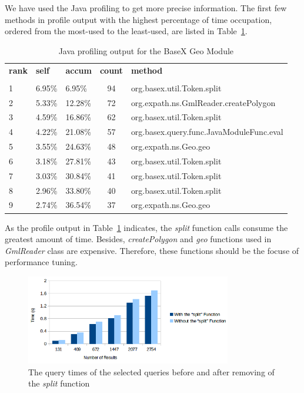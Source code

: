 \documentclass[a4paper,12pt]{article}
\begin{document}
We have used the Java profiling to get more precise information. The first few methods in profile output with the highest percentage of time occupation, ordered from the most-used to the least-used, are listed in Table~\ref{javaprofile}.
\begin{table}
\begin{tabular}{l l l c l}
\textbf{rank} & \textbf{self} & \textbf{accum} & \textbf{count} & \textbf{method} \\
 & & & &\\
1 & 6.95\% & 6.95\% & 94 & org.basex.util.Token.{\color{red}split}\\
2 & 5.33\% & 12.28\% & 72 & org.expath.ns.GmlReader.createPolygon \\
3 & 4.59\% & 16.86\% & 62 & org.basex.util.Token.{\color{red}split} \\
4 & 4.22\% & 21.08\% & 57 & org.basex.query.func.JavaModuleFunc.eval \\
5 & 3.55\% & 24.63\% & 48 & org.expath.ns.Geo.geo \\
6 & 3.18\% & 27.81\% & 43 & org.basex.util.Token.{\color{red}split} \\
7 & 3.03\% & 30.84\% & 41 & org.basex.util.Token.{\color{red}split} \\
8 & 2.96\% & 33.80\% & 40 & org.basex.util.Token.{\color{red}split} \\
9 & 2.74\% & 36.54\% & 37 & org.expath.ns.Geo.geo \\
\end{tabular}
\caption{Java profiling output for the BaseX Geo Module}
\label{javaprofile}
\end{table}
As the profile output in Table~\ref{javaprofile} indicates, the \textit{split} function calls consume the greatest amount of time. Besides, \textit{create\-Polygon} and \textit{geo} functions used in \textit{GmlReader} class are expensive. Therefore, these functions should be the focuse of performance tuning. 
\begin{figure}
\centering
\includegraphics[width=0.8\textwidth]{BXSplit}
\caption{The query times of the selected queries before and after removing of the \textit{split} function}
\label{figBXSplit}
\end{figure}
\end{document}
